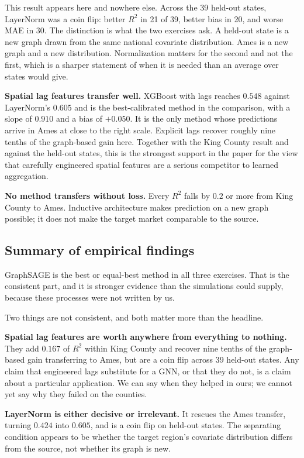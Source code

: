 \documentclass[ASNA, twocolumn]{USG} %
\begin{document}
This result appears here and nowhere else. Across the 39 held-out states, LayerNorm was a coin flip: better \(R^2\) in 21 of 39, better bias in 20, and worse MAE in 30. The distinction is what the two exercises ask. A held-out state is a new graph drawn from the same national covariate distribution. Ames is a new graph and a new distribution. Normalization matters for the second and not the first, which is a sharper statement of when it is needed than an average over states would give.

\textbf{Spatial lag features transfer well.} XGBoost with lags reaches \(0.548\) against LayerNorm's \(0.605\) and is the best-calibrated method in the comparison, with a slope of \(0.910\) and a bias of \(+0.050\). It is the only method whose predictions arrive in Ames at close to the right scale. Explicit lags recover roughly nine tenths of the graph-based gain here. Together with the King County result and against the held-out states, this is the strongest support in the paper for the view that carefully engineered spatial features are a serious competitor to learned aggregation.

\textbf{No method transfers without loss.} Every \(R^2\) falls by \(0.2\) or more from King County to Ames. Inductive architecture makes prediction on a new graph possible; it does not make the target market comparable to the source.

\subsection{Summary of empirical findings}

GraphSAGE is the best or equal-best method in all three exercises. That is the consistent part, and it is stronger evidence than the simulations could supply, because these processes were not written by us.

Two things are not consistent, and both matter more than the headline.

\textbf{Spatial lag features are worth anywhere from everything to nothing.} They add \(0.167\) of \(R^2\) within King County and recover nine tenths of the graph-based gain transferring to Ames, but are a coin flip across 39 held-out states. Any claim that engineered lags substitute for a GNN, or that they do not, is a claim about a particular application. We can say when they helped in ours; we cannot yet say why they failed on the counties.

\textbf{LayerNorm is either decisive or irrelevant.} It rescues the Ames transfer, turning \(0.424\) into \(0.605\), and is a coin flip on held-out states. The separating condition appears to be whether the target region's covariate distribution differs from the source, not whether its graph is new.
\end{document}
